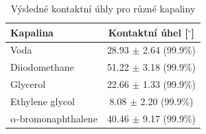 \documentclass[12pt]{article}
\begin{document}
\begin{table}[htbp]
\begin{center}
\begin{tabular}{|l|c|}
	\hline
     Kapalina & Kontaktní úhel [$^\circ$] \\ \hline \hline
    Voda                   &  28.93 $\pm$ 2.64 (99.9\%) \\ \hline
    Diiodomethane          &  51.22 $\pm$ 3.18 (99.9\%) \\ \hline
    Glycerol               &  22.66 $\pm$ 1.33 (99.9\%) \\ \hline
    Ethylene glycol        &  8.08  $\pm$ 2.20 (99.9\%) \\ \hline
    $\alpha$-bromonaphthalene     &  40.46 $\pm$ 9.17 (99.9\%) \\ \hline
\end{tabular}
\caption{Výsledné kontaktní úhly pro různé kapaliny}
\label{uhly-final}
\end{center}
\end{table}
\end{document}
